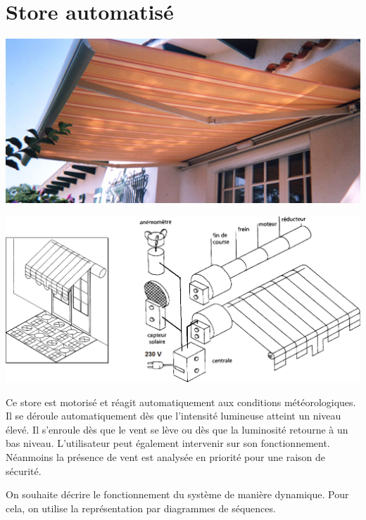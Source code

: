 \documentclass[10pt]{article}
\begin{document}
\section*{Store automatisé}
\begin{minipage}[c]{.3\linewidth}
\begin{center}
\includegraphics[width=\textwidth]{images/store_01}
\end{center}
\end{minipage}\hfill
\begin{minipage}[c]{.67\linewidth}
\begin{center}
\includegraphics[width=\textwidth]{images/store_02}
\end{center}
\end{minipage}

Ce store est motorisé et réagit automatiquement aux conditions météorologiques. Il se déroule automatiquement dès que l'intensité lumineuse atteint un niveau élevé. Il s'enroule dès que le vent se lève ou dès que la luminosité retourne à un bas niveau. L'utilisateur peut également intervenir sur son fonctionnement. Néanmoins la présence de vent est analysée en priorité pour une raison de sécurité. 

On souhaite décrire le fonctionnement du système de manière dynamique. Pour cela, on utilise la représentation par diagrammes de séquences.
\end{document}
